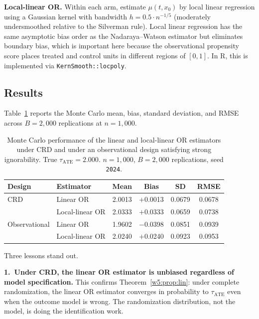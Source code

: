 \documentclass[master.tex]{subfiles}
\begin{document}
\medskip
\noindent\textbf{Local-linear OR.}  Within each arm, estimate
$\mu(t,x_0)$ by local linear regression using a Gaussian kernel with
bandwidth $h = 0.5 \cdot n^{-1/5}$ (moderately undersmoothed relative
to the Silverman rule).  Local linear regression has the same
asymptotic bias order as the Nadaraya--Watson estimator but eliminates
boundary bias, which is important here because the observational
propensity score places treated and control units in different regions
of $[0,1]$.  In R, this is implemented via \texttt{KernSmooth::locpoly}.

\subsection*{Results}

Table~\ref{w5:tab:lab} reports the Monte Carlo mean, bias, standard
deviation, and RMSE across $B = 2{,}000$ replications at $n = 1{,}000$.

\begin{table}[h]
\centering
\renewcommand{\arraystretch}{1.5}
\caption{Monte Carlo performance of the linear and local-linear OR
  estimators under CRD and under an observational design satisfying
  strong ignorability.  True $\tau_{\mathrm{ATE}} = 2.000$.
  $n = 1{,}000$, $B = 2{,}000$ replications, seed \texttt{2024}.}
\label{w5:tab:lab}
\begin{tabular}{llcccc}
\toprule
\textbf{Design} & \textbf{Estimator} & \textbf{Mean} & \textbf{Bias}
  & \textbf{SD} & \textbf{RMSE} \\
\midrule
CRD
  & Linear OR       & 2.0013 &  $+$0.0013 & 0.0679 & 0.0678 \\
  & Local-linear OR & 2.0333 &  $+$0.0333 & 0.0659 & 0.0738 \\
\midrule
Observational
  & Linear OR       & 1.9602 & $-$0.0398 & 0.0851 & 0.0939 \\
  & Local-linear OR & 2.0240 & $+$0.0240 & 0.0923 & 0.0953 \\
\bottomrule
\end{tabular}
\end{table}

\medskip
Three lessons stand out.

\medskip
\noindent\textbf{1.\ Under CRD, the linear OR estimator is unbiased 
regardless of model specification.}   This confirms
Theorem~\ref{w5:prop:lin}: under complete randomization, the linear
OR estimator converges in probability to $\tau_{\mathrm{ATE}}$ even
when the outcome model is wrong.  The randomization distribution,
not the model, is doing the identification work.
\end{document}

